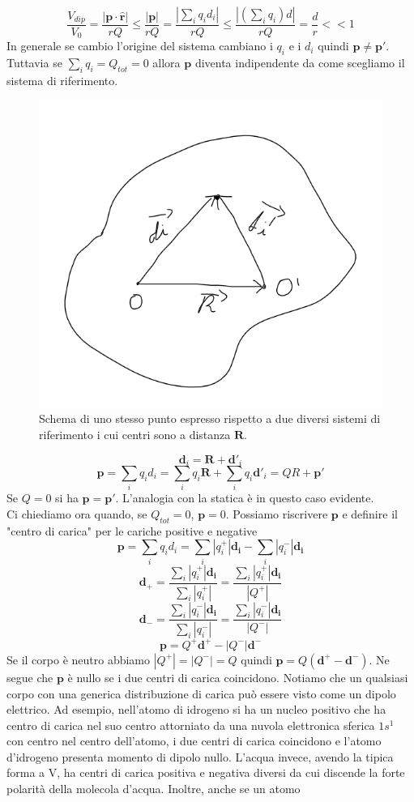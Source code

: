 \documentclass[10pt,a4paper]{article}
\begin{document}
 \[\frac{V_{dip}}{V_0} = \frac{|\mathbf{p}\cdot \hat{\mathbf{r}}|}{rQ}\leq\frac{|\mathbf{p}|}{rQ} = \frac{|\sum_i q_i d_i|}{rQ}\leq \frac{|(\sum_i q_i)d|}{rQ} = \frac{d}{r}<<1\]
 In generale se cambio l'origine del sistema cambiano i \(q_i\) e i \(d_i\) quindi \(\mathbf{p}\neq\mathbf{p}'\). Tuttavia se \(\sum_i q_i = Q_{tot} = 0\) allora $\mathbf{p}$ diventa indipendente da come scegliamo il sistema di riferimento. 
\begin{figure}[h!]
	\centering
	\includegraphics[width=0.5\linewidth]{images/dipolo_SR}
	\caption{Schema di uno stesso punto espresso rispetto a due diversi sistemi di riferimento i cui centri sono a distanza \(\mathbf{R}\).}
	\label{fig:dipolosr}
\end{figure}
\FloatBarrier
\[\mathbf{d}_i = \mathbf{R}+\mathbf{d}'_i\]
\[\mathbf{p} = \sum_iq_id_i = \sum_iq_i\mathbf{R}+\sum_iq_i\mathbf{d}'_i=QR+\mathbf{p}'\]
Se \(Q = 0\) si ha \(\mathbf{p} = \mathbf{p}'\). L'analogia con la statica è in questo caso evidente.\\
Ci chiediamo ora quando, se \(Q_{tot} = 0\), $\mathbf{p} = 0$. Possiamo riscrivere $\mathbf{p}$ e definire il "centro di carica" per le cariche positive e negative 
\[\mathbf{p} = \sum_iq_id_i = \sum_i|q_i^+|\mathbf{d_i}-\sum_i|q_i^-|\mathbf{d_i}\]
\[\mathbf{d}_+ = \frac{\sum_i|q_i^+|\mathbf{d_i}}{\sum_i|q_i^+|} = \frac{\sum_i|q_i^+|\mathbf{d_i}}{|Q^+|}\]
\[\mathbf{d}_- = \frac{\sum_i|q_i^-|\mathbf{d_i}}{\sum_i|q_i^-|} = \frac{\sum_i|q_i^-|\mathbf{d_i}}{|Q^-|}\]
\[\mathbf{p} = Q^+\mathbf{d}^+-|Q^-|\mathbf{d}^-\]
Se il corpo è neutro abbiamo \(|Q^+|=|Q^-|=Q\) quindi \(\mathbf{p} = Q(\mathbf{d}^+-\mathbf{d}^-)\). Ne segue che $\mathbf{p}$ è nullo se i due centri di carica coincidono. Notiamo che un qualsiasi corpo con una generica distribuzione di carica può essere visto come un dipolo elettrico. Ad esempio, nell'atomo di idrogeno si ha un nucleo positivo che ha centro di carica nel suo centro attorniato da una nuvola elettronica sferica \(1s^1\) con centro nel centro dell'atomo, i due centri di carica coincidono e l'atomo d'idrogeno presenta momento di dipolo nullo. L'acqua invece, avendo la tipica forma a V, ha centri di carica positiva e negativa diversi da cui discende la forte polarità della molecola d'acqua. Inoltre, anche se un atomo 
\end{document}
